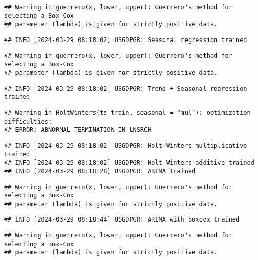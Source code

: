 \documentclass[
]{article}
\begin{document}
\begin{verbatim}
## Warning in guerrero(x, lower, upper): Guerrero's method for selecting a Box-Cox
## parameter (lambda) is given for strictly positive data.
\end{verbatim}

\begin{verbatim}
## INFO [2024-03-29 08:18:02] USGDPGR: Seasonal regression trained
\end{verbatim}

\begin{verbatim}
## Warning in guerrero(x, lower, upper): Guerrero's method for selecting a Box-Cox
## parameter (lambda) is given for strictly positive data.
\end{verbatim}

\begin{verbatim}
## INFO [2024-03-29 08:18:02] USGDPGR: Trend + Seasonal regression trained
\end{verbatim}

\begin{verbatim}
## Warning in HoltWinters(ts_train, seasonal = "mul"): optimization difficulties:
## ERROR: ABNORMAL_TERMINATION_IN_LNSRCH
\end{verbatim}

\begin{verbatim}
## INFO [2024-03-29 08:18:02] USGDPGR: Holt-Winters multiplicative trained
## INFO [2024-03-29 08:18:02] USGDPGR: Holt-Winters additive trained
## INFO [2024-03-29 08:18:28] USGDPGR: ARIMA trained
\end{verbatim}

\begin{verbatim}
## Warning in guerrero(x, lower, upper): Guerrero's method for selecting a Box-Cox
## parameter (lambda) is given for strictly positive data.
\end{verbatim}

\begin{verbatim}
## INFO [2024-03-29 08:18:44] USGDPGR: ARIMA with boxcox trained
\end{verbatim}

\begin{verbatim}
## Warning in guerrero(x, lower, upper): Guerrero's method for selecting a Box-Cox
## parameter (lambda) is given for strictly positive data.
\end{verbatim}
\end{document}
